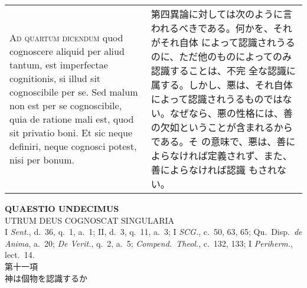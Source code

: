 \documentclass[10pt]{jsarticle} %
\begin{document}
\begin{longtable}{p{21em}p{21em}}
\\


{\scshape Ad quartum dicendum} quod cognoscere aliquid
per aliud tantum, est imperfectae cognitionis, si illud sit cognoscibile
per se. Sed malum non est per se cognoscibile, quia de ratione mali est,
quod sit privatio boni. Et sic neque definiri, neque cognosci potest,
nisi per bonum.

&

第四異論に対しては次のように言われるべきである。何かを、それがそれ自体
によって認識されうるのに、ただ他のものによってのみ認識することは、不完
全な認識に属する。しかし、悪は、それ自体によって認識されうるものではな
い。なぜなら、悪の性格には、善の欠如ということが含まれるからである。そ
の意味で、悪は、善によらなければ定義されず、また、善によらなければ認識
もされない。


\end{longtable}
\newpage




\begin{center}
 {\Large {\bf QUAESTIO UNDECIMUS}}\\
 {\large UTRUM DEUS COGNOSCAT SINGULARIA}\\
 {\footnotesize I {\itshape Sent.}, d.~36, q.~1, a.~1; II, d.~3, q.~11,
 a.~3; I {\itshape SCG.}, c.~50, 63, 65; Qu.~Disp.~{\itshape de Anima},
 a.~20; {\itshape De Verit.}, q.~2, a.~5; {\itshape Compend.~Theol.},
 c.~132, 133; I {\itshape Periherm.}, lect.~14.}\\
 {\Large 第十一項\\神は個物を認識するか}
\end{center}
\end{document}
